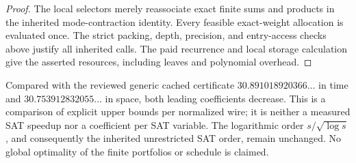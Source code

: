 \begin{proof}
The local selectors merely reassociate exact finite sums and products in
the inherited mode-contraction identity. Every feasible exact-weight
allocation is evaluated once. The strict packing, depth, precision, and
entry-access checks above justify all inherited calls. The paid recurrence
and local storage calculation give the asserted resources, including leaves
and polynomial overhead.
\end{proof}

Compared with the reviewed generic cached certificate
$30.891018920366\ldots$ in time and $30.753912832055\ldots$ in space,
both leading coefficients decrease. This is a comparison of explicit upper
bounds per normalized wire; it is neither a measured SAT speedup nor a
coefficient per SAT variable. The logarithmic order
$s/\sqrt{\log s}$, and consequently the inherited unrestricted SAT order,
remain unchanged. No global optimality of the finite portfolios or schedule
is claimed.
